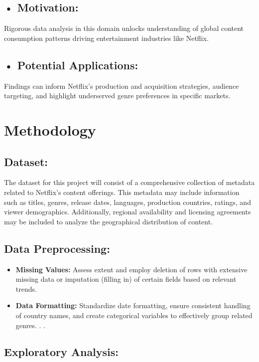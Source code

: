 \documentclass[12pt]{article}
\begin{document}
\subsection{•	Motivation:}
Rigorous data analysis in this domain unlocks understanding of global content consumption patterns driving entertainment industries like Netflix.
\subsection{•	Potential Applications:}
Findings can inform Netflix's production and acquisition strategies, audience targeting, and highlight underserved genre preferences in specific markets.




\section{Methodology}
\subsection{Dataset:}

The dataset for this project will consist of a comprehensive collection of metadata related to Netflix's content offerings. This metadata may include information such as titles, genres, release dates, languages, production countries, ratings, and viewer demographics. Additionally, regional availability and licensing agreements may be included to analyze the geographical distribution of content.

\subsection{Data Preprocessing:}


\begin{itemize}
\item 	\textbf{Missing Values:} \newline
Assess extent and employ deletion of rows with extensive missing data or imputation (filling in) of certain fields based on relevant trends.
\item 	\textbf{Data Formatting:}\newline
Standardize date formatting, ensure consistent handling of country names, and create categorical variables to effectively group related genres.
.
.
\end{itemize}




\subsection{Exploratory Analysis:}
\end{document}
